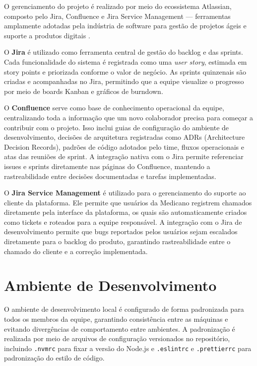 O gerenciamento do projeto é realizado por meio do
ecossistema Atlassian, composto pelo Jira, Confluence
e Jira Service Management — ferramentas amplamente
adotadas pela indústria de software para gestão de
projetos ágeis e suporte a produtos digitais
\cite{atlassian2024}.

O \textbf{Jira} é utilizado como ferramenta central
de gestão do backlog e das sprints. Cada funcionalidade
do sistema é registrada como uma \textit{user story},
estimada em story points e priorizada conforme o valor
de negócio. As sprints quinzenais são criadas e
acompanhadas no Jira, permitindo que a equipe visualize
o progresso por meio de boards Kanban e gráficos de
burndown.

O \textbf{Confluence} serve como base de conhecimento
operacional da equipe, centralizando toda a informação
que um novo colaborador precisa para começar a
contribuir com o projeto. Isso inclui guias de
configuração do ambiente de desenvolvimento, decisões
de arquitetura registradas como ADRs (Architecture
Decision Records), padrões de código adotados pelo
time, fluxos operacionais e atas das reuniões de
sprint. A integração nativa com o Jira permite
referenciar issues e sprints diretamente nas páginas
do Confluence, mantendo a rastreabilidade entre
decisões documentadas e tarefas implementadas.

O \textbf{Jira Service Management} é utilizado para
o gerenciamento do suporte ao cliente da plataforma.
Ele permite que usuários da Medicano registrem chamados
diretamente pela interface da plataforma, os quais são
automaticamente criados como tickets e roteados para
a equipe responsável. A integração com o Jira de
desenvolvimento permite que bugs reportados pelos
usuários sejam escalados diretamente para o backlog
do produto, garantindo rastreabilidade entre o chamado
do cliente e a correção implementada.

\section{Ambiente de Desenvolvimento}
\label{sec:dev-environment}

O ambiente de desenvolvimento local é configurado de
forma padronizada para todos os membros da equipe,
garantindo consistência entre as máquinas e evitando
divergências de comportamento entre ambientes. A
padronização é realizada por meio de arquivos de
configuração versionados no repositório, incluindo
\texttt{.nvmrc} para fixar a versão do Node.js e
\texttt{.eslintrc} e \texttt{.prettierrc} para
padronização do estilo de código.

